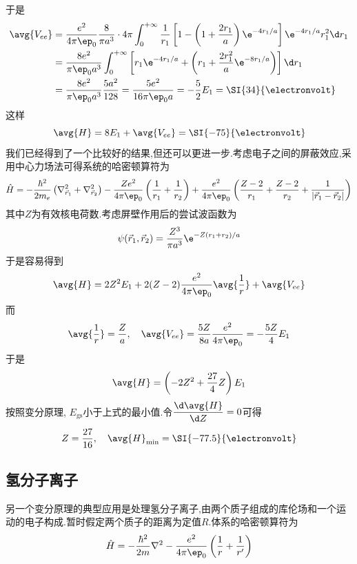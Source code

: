 \documentclass{ctexart}
\begin{document}
于是
\[\begin{aligned}
    \avg{V_{ee}}
    &=\dfrac{e^2}{4\pi\ep_0}\dfrac{8}{\pi a^3}\cdot4\pi\int_0^{+\infty}\dfrac{1}{r_1}\left[1-\left(1+\dfrac{2r_1}{a}\right)\e^{-4r_1/a}\right]\e^{-4r_1/a}r_1^2\d r_1\\
    &=\dfrac{8e^2}{\pi\ep_0 a^3}\int_0^{+\infty}\left[r_1\e^{-4r_1/a}+\left(r_1+\dfrac{2r_1^2}{a}\e^{-8r_1/a}\right)\right]\d r_1\\
    &=\dfrac{8e^2}{\pi\ep_0 a^3}\dfrac{5a^2}{128}=\dfrac{5e^2}{16\pi\ep_0 a}=-\dfrac{5}{2}E_1=\SI{34}{\electronvolt}
\end{aligned}\]
这样
\[\avg{H}=8E_1+\avg{V_{ee}}=\SI{-75}{\electronvolt}\]
\indent 我们已经得到了一个比较好的结果,但还可以更进一步.考虑电子之间的屏蔽效应,采用中心力场法可得系统的哈密顿算符为
\[\hat{H}=-\dfrac{\hbar^2}{2m_e}\left(\nabla_{\vec{r}_1}^2+\nabla_{\vec{r}_2}^2\right)-\dfrac{Ze^2}{4\pi\ep_0}\left(\dfrac{1}{r_1}+\dfrac{1}{r_2}\right)+\dfrac{e^2}{4\pi\ep_0}\left(\dfrac{Z-2}{r_1}+\dfrac{Z-2}{r_2}+\dfrac{1}{\left|\vec{r}_1-\vec{r}_2\right|}\right)\]
其中$Z$为有效核电荷数.考虑屏壁作用后的尝试波函数为
\[\psi(\vec{r}_1,\vec{r}_2)=\dfrac{Z^3}{\pi a^3}\e^{-Z(r_1+r_2)/a}\]
于是容易得到
\[\avg{H}=2Z^2E_1+2(Z-2)\dfrac{e^2}{4\pi\ep_0}\avg{\dfrac1r}+\avg{V_{ee}}\]
而
\[\avg{\dfrac1r}=\dfrac{Z}{a},\quad\avg{V_{ee}}=\dfrac{5Z}{8a}\dfrac{e^2}{4\pi\ep_0}=-\dfrac{5Z}{4}E_1\]
于是
\[\avg{H}=\left(-2Z^2+\dfrac{27}{4}Z\right)E_1\]
\indent 按照变分原理, $E_{\text{gs}}$小于上式的最小值.令$\dfrac{\d\avg{H}}{\d Z}=0$可得
\[Z=\dfrac{27}{16},\quad\avg{H}_{\min}=\SI{-77.5}{\electronvolt}\]
\subsection{氢分子离子}
另一个变分原理的典型应用是处理氢分子离子,由两个质子组成的库伦场和一个运动的电子构成.暂时假定两个质子的距离为定值$R$.体系的哈密顿算符为
\[\hat{H}=-\dfrac{\hbar^2}{2m}\nabla^2-\dfrac{e^2}{4\pi\ep_0}\left(\dfrac1r+\dfrac1{r'}\right)\]
\end{document}
